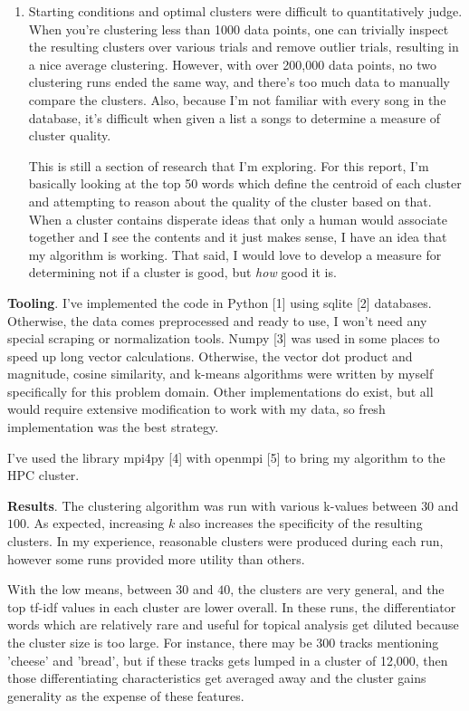 \documentclass[11pt]{article}
\begin{document}
\begin{enumerate}
    \item Starting conditions and optimal clusters were difficult to quantitatively 
    judge. When you're clustering less than 1000 data points, one can trivially 
    inspect the resulting clusters over various trials and remove outlier trials,
    resulting in a nice average clustering. However, with over 200,000 data points,
    no two clustering runs ended the same way, and there's too much data to 
    manually compare the clusters. Also, because I'm not familiar with every song
    in the database, it's difficult when given a list a songs to determine a 
    measure of cluster quality.

    This is still a section of research that I'm exploring. For this report,
    I'm basically looking at the top 50 words which define the centroid of 
    each cluster and attempting to reason about the quality of the cluster
    based on that. When a cluster contains disperate ideas that only a human
    would associate together and I see the contents and it just makes sense, I 
    have an idea that my algorithm is working. That said, I would love to 
    develop a measure for determining not if a cluster is good, but \emph{how} good it is.
\end{enumerate}

\textbf{Tooling}. I've implemented the code in Python [1] using sqlite [2] databases. 
Otherwise, the data comes preprocessed and ready to use, I won't need any special
scraping or normalization tools. Numpy [3] was used in some places to speed up
long vector calculations. Otherwise, the vector dot product and magnitude, cosine
similarity, and k-means algorithms were written by myself specifically for this
problem domain. Other implementations do exist, but all would require extensive
modification to work with my data, so fresh implementation was the best strategy.

I've used the library mpi4py [4] with openmpi [5] to bring my algorithm to the
HPC cluster.

\textbf{Results}. The clustering algorithm was run with various k-values between
$30$ and $100$. As expected, increasing $k$ also increases the specificity of
the resulting clusters. In my experience, reasonable clusters were produced during
each run, however some runs provided more utility than others. 

With the low means, between $30$ and $40$, the clusters are very general, and
the top tf-idf values in each cluster are lower overall. In these runs, the
differentiator words which are relatively rare and useful for topical analysis
get diluted because the cluster size is too large.  For instance, there may be
300 tracks mentioning 'cheese' and 'bread', but if these tracks gets lumped in
a cluster of 12,000, then those differentiating characteristics get averaged
away and the cluster gains generality as the expense of these features.
\end{document}
